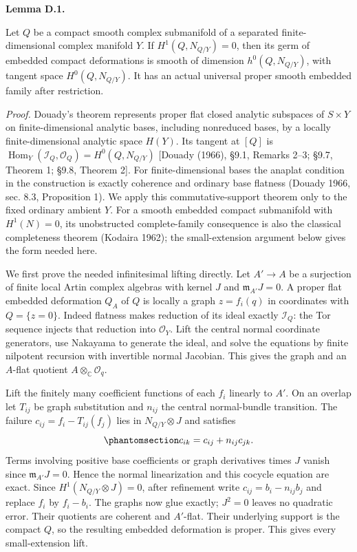 \documentclass[
  english,
  11pt,
  reqno]{amsart}
\makeatletter
\newcommand{\pandocstatementheading}[1]{%
  \par\addpenalty{\@beginparpenalty}%
  \addvspace{.5\baselineskip plus .2\baselineskip minus .2\baselineskip}%
  {\normalfont\bfseries #1\par}%
  \nobreak\@afterindenttrue\@afterheading
}
\makeatother
\begin{document}
\pandocstatementheading{\protect{}\label{lem:gg-compact-support-completeness}Lemma D.1.}

Let \(Q\) be a compact smooth complex submanifold of a separated
finite-dimensional complex manifold \(Y\). If \(H^1(Q,N_{Q/Y})=0\), then
its germ of embedded compact deformations is smooth of dimension
\(h^0(Q,N_{Q/Y})\), with tangent space \(H^0(Q,N_{Q/Y})\). It has an
actual universal proper smooth embedded family after restriction.

\emph{Proof.} Douady's theorem represents proper flat closed analytic
subspaces of \(S\times Y\) on finite-dimensional analytic bases,
including nonreduced bases, by a locally finite-dimensional analytic
space \(H(Y)\). Its tangent at \([Q]\) is
\(\operatorname{Hom}_Y(\mathcal I_Q,\mathcal O_Q)=H^0(Q,N_{Q/Y})\)
{[}Douady (1966), §9.1, Remarks 2--3; §9.7, Theorem 1; §9.8, Theorem
2{]}. For finite-dimensional bases the anaplat condition in the
construction is exactly coherence and ordinary base flatness (Douady
1966, sec. 8.3, Proposition 1). We apply this commutative-support
theorem only to the fixed ordinary ambient \(Y\). For a smooth embedded
compact submanifold with \(H^1(N)=0\), its unobstructed complete-family
consequence is also the classical completeness theorem (Kodaira 1962);
the small-extension argument below gives the form needed here.

We first prove the needed infinitesimal lifting directly. Let
\(A'\to A\) be a surjection of finite local Artin complex algebras with
kernel \(J\) and \(\mathfrak m_{A'}J=0\). A proper flat embedded
deformation \(Q_A\) of \(Q\) is locally a graph \(z=f_i(q)\) in
coordinates with \(Q=\{z=0\}\). Indeed flatness makes reduction of its
ideal exactly \(\mathcal I_Q\): the Tor sequence injects that reduction
into \(\mathcal O_Y\). Lift the central normal coordinate generators,
use Nakayama to generate the ideal, and solve the equations by finite
nilpotent recursion with invertible normal Jacobian. This gives the
graph and an \(A\)-flat quotient \(A\otimes_{\mathbb C}\mathcal O_q\).

Lift the finitely many coefficient functions of each \(f_i\) linearly to
\(A'\). On an overlap let \(T_{ij}\) be graph substitution and
\(n_{ij}\) the central normal-bundle transition. The failure
\(c_{ij}=f_i-T_{ij}(f_j)\) lies in \(N_{Q/Y}\otimes J\) and satisfies
\begin{equation}\protect\phantomsection\label{eq:gg-compact-support-small-extension}{
 c_{ik}=c_{ij}+n_{ij}c_{jk}.
}\end{equation} Terms involving positive base coefficients or graph
derivatives times \(J\) vanish since \(\mathfrak m_{A'}J=0\). Hence the
normal linearization and this cocycle equation are exact. Since
\(H^1(N_{Q/Y}\otimes J)=0\), after refinement write
\(c_{ij}=b_i-n_{ij}b_j\) and replace \(f_i\) by \(f_i-b_i\). The graphs
now glue exactly; \(J^2=0\) leaves no quadratic error. Their quotients
are coherent and \(A'\)-flat. Their underlying support is the compact
\(Q\), so the resulting embedded deformation is proper. This gives every
small-extension lift.
\end{document}
